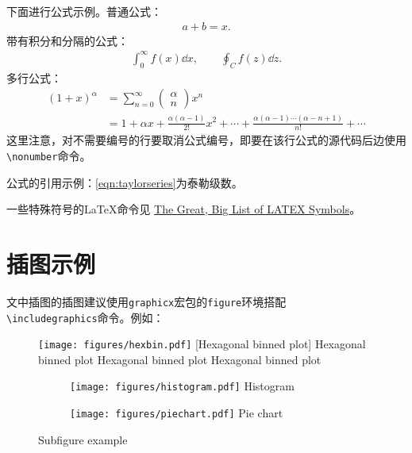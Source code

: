 下面进行公式示例。普通公式：
\begin{align}
    a+b=x.
\end{align}
带有积分和分隔的公式：
\begin{align}
   \int^{\infty}_{0} f(x)\dd{x}, \qquad \oint_{C} f(z)\dd {z}.
\end{align}
多行公式：
\begin{align}
    \left(1+x\right)^{\alpha} &= \sum^{\infty}_{n=0}\left(\begin{matrix} \alpha \\ n\end{matrix}\right)x^n \nonumber \\ 
    &= 1 + \alpha x + \frac{\alpha(\alpha-1)}{2!}x^2 + \cdots + \frac{\alpha(\alpha-1)\cdots(\alpha-n+1)}{n!} + \cdots
    \label{eqn:taylorseries}
\end{align}
这里注意，对不需要编号的行要取消公式编号，即要在该行公式的源代码后边使用\texttt{\textbackslash nonumber}命令。

公式的引用示例：\ref{eqn:taylorseries}为泰勒级数。

一些特殊符号的\LaTeX{}命令见 \href{https://mirrors.ustc.edu.cn/CTAN/info/symbols/comprehensive/symbols-a4.pdf}{The Great, Big List of LATEX Symbols}。

\section{插图示例}

文中插图的插图建议使用\texttt{graphicx}宏包的\texttt{figure}环境搭配 \\ \texttt{\textbackslash includegraphics}命令。例如：
\begin{figure}[htbp]
	\centering
	\texttt{[image: figures/hexbin.pdf]}
	[Hexagonal binned plot]
    {Hexagonal binned plot Hexagonal binned plot Hexagonal binned plot}
	\label{fig:hexbin}
\end{figure}
\begin{figure}[htbp]
	\centering
    \begin{subfigure}{0.45\textwidth}
        \centering
	    \texttt{[image: figures/histogram.pdf]}
        {Histogram}
    \end{subfigure}
    \begin{subfigure}{0.45\textwidth}
        \centering
	    \texttt{[image: figures/piechart.pdf]}
        {Pie chart}
    \end{subfigure}
    {Subfigure example}
    \label{fig:subfig}
\end{figure}


